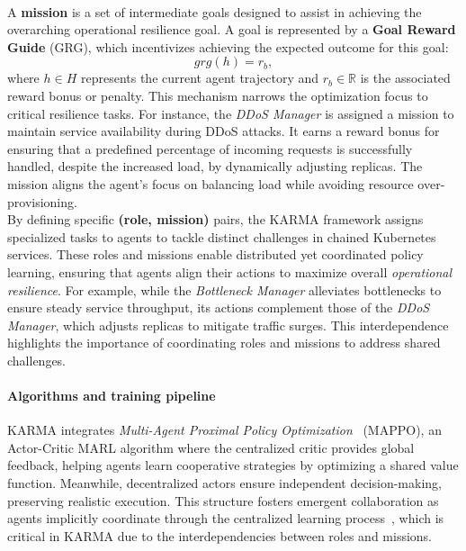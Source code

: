 \

A \textbf{mission} is a set of intermediate goals designed to assist in achieving the overarching operational resilience goal. A goal is represented by a \textbf{Goal Reward Guide} (GRG), which incentivizes achieving the expected outcome for this goal:
$$
grg(h) = r_b,
$$
where \(h \in H\) represents the current agent trajectory and \(r_b \in \mathbb{R}\) is the associated reward bonus or penalty. This mechanism narrows the optimization focus to critical resilience tasks. For instance, the \textit{DDoS Manager} is assigned a mission to maintain service availability during DDoS attacks. It earns a reward bonus for ensuring that a predefined percentage of incoming requests is successfully handled, despite the increased load, by dynamically adjusting replicas. The mission aligns the agent's focus on balancing load while avoiding resource over-provisioning.\\

By defining specific \textbf{(role, mission)} pairs, the KARMA framework assigns specialized tasks to agents to tackle distinct challenges in chained Kubernetes services. These roles and missions enable distributed yet coordinated policy learning, ensuring that agents align their actions to maximize overall \textit{operational resilience}. For example, while the \textit{Bottleneck Manager} alleviates bottlenecks to ensure steady service throughput, its actions complement those of the \textit{DDoS Manager}, which adjusts replicas to mitigate traffic surges. This interdependence highlights the importance of coordinating roles and missions to address shared challenges.

\paragraph*{Algorithms and training pipeline}

KARMA integrates \textit{Multi-Agent Proximal Policy Optimization}~\cite{Yu2022} (MAPPO), an Actor-Critic MARL algorithm where the centralized critic provides global feedback, helping agents learn cooperative strategies by optimizing a shared value function. Meanwhile, decentralized actors ensure independent decision-making, preserving realistic execution. This structure fosters emergent collaboration as agents implicitly coordinate through the centralized learning process~\cite{Yu2022}, which is critical in KARMA due to the interdependencies between roles and missions.

